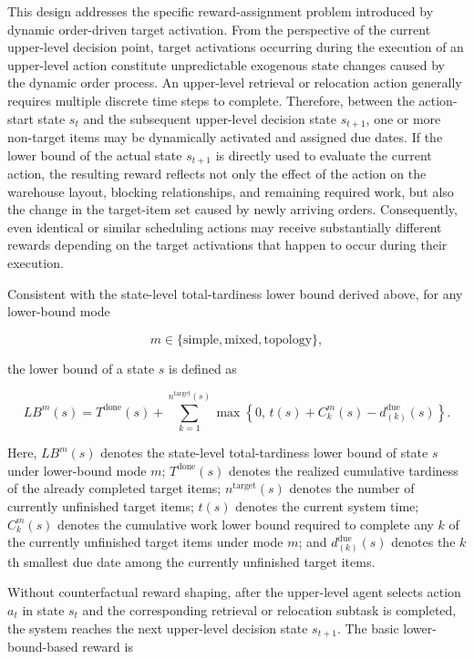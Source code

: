 This design addresses the specific reward-assignment problem introduced by dynamic order-driven target activation. From the perspective of the current upper-level decision point, target activations occurring during the execution of an upper-level action constitute unpredictable exogenous state changes caused by the dynamic order process. An upper-level retrieval or relocation action generally requires multiple discrete time steps to complete. Therefore, between the action-start state $s_t$ and the subsequent upper-level decision state $s_{t+1}$, one or more non-target items may be dynamically activated and assigned due dates. If the lower bound of the actual state $s_{t+1}$ is directly used to evaluate the current action, the resulting reward reflects not only the effect of the action on the warehouse layout, blocking relationships, and remaining required work, but also the change in the target-item set caused by newly arriving orders. Consequently, even identical or similar scheduling actions may receive substantially different rewards depending on the target activations that happen to occur during their execution.

Consistent with the state-level total-tardiness lower bound derived above, for any lower-bound mode

\[
m \in
\{\mathrm{simple},\mathrm{mixed},\mathrm{topology}\},
\]

the lower bound of a state $s$ is defined as

\[
LB^m(s)
=
T^{\mathrm{done}}(s)
+
\sum_{k=1}^{n^{\mathrm{target}}(s)}
\max
\left\{
0,\,
t(s)+C_k^m(s)-d_{(k)}^{\mathrm{due}}(s)
\right\}.
\]

Here, $LB^m(s)$ denotes the state-level total-tardiness lower bound of state $s$ under lower-bound mode $m$; $T^{\mathrm{done}}(s)$ denotes the realized cumulative tardiness of the already completed target items; $n^{\mathrm{target}}(s)$ denotes the number of currently unfinished target items; $t(s)$ denotes the current system time; $C_k^m(s)$ denotes the cumulative work lower bound required to complete any $k$ of the currently unfinished target items under mode $m$; and $d_{(k)}^{\mathrm{due}}(s)$ denotes the $k$th smallest due date among the currently unfinished target items.

Without counterfactual reward shaping, after the upper-level agent selects action $a_t$ in state $s_t$ and the corresponding retrieval or relocation subtask is completed, the system reaches the next upper-level decision state $s_{t+1}$. The basic lower-bound-based reward is

